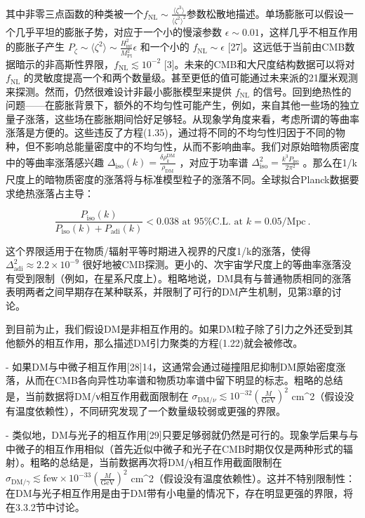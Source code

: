 其中非零三点函数的种类被一个\( f_{\text{NL}} \sim \frac{\langle\zeta^3\rangle}{\langle\zeta^2\rangle^2} \)参数松散地描述。单场膨胀可以假设一个几乎平坦的膨胀子势，对应于一个小的慢滚参数 \( \epsilon \sim 0.01 \)，这样几乎不相互作用的膨胀子产生 \( P_\zeta \sim \langle\zeta^2\rangle \sim \frac{H^2_{\text{inf}}}{M^2_{\text{Pl}}}\epsilon \) 和一个小的 \( f_{\text{NL}} \sim \epsilon \) [27]。这远低于当前由CMB数据暗示的非高斯性界限，\( f_{\text{NL}} \lesssim 10^{-2} \) [3]。未来的CMB和大尺度结构数据可以将对 \( f_{\text{NL}} \) 的灵敏度提高一个和两个数量级。甚至更低的值可能通过未来派的21厘米观测来探测。然而，仍然很难设计非最小膨胀模型来提供 \( f_{\text{NL}} \) 的信号。回到绝热性的问题——在膨胀背景下，额外的不均匀性可能产生，例如，来自其他一些场的独立量子涨落，这些场在膨胀期间恰好足够轻。从现象学角度来看，考虑所谓的等曲率涨落是方便的。这些违反了方程(1.35)，通过将不同的不均匀性归因于不同的物种，但不影响总能量密度中的不均匀性，从而不影响曲率。我们对原始暗物质密度中的等曲率涨落感兴趣 \( \Delta_{\text{iso}}(k) = \frac{\delta\rho_k^{\text{DM}}}{\rho_{\text{DM}}} \) ，对应于功率谱 \( \Delta^2_{\text{iso}} = \frac{k^3P_{\text{iso}}}{2\pi^2} \) 。那么在1/k尺度上的暗物质密度的涨落将与标准模型粒子的涨落不同。全球拟合Planck数据要求绝热涨落占主导：

\[ \frac{P_{\text{iso}}(k)}{P_{\text{iso}}(k) + P_{\text{adi}}(k)} < 0.038 \text{ at 95\% C.L. at } k = 0.05/\text{Mpc} ~. \]

这个界限适用于在物质/辐射平等时期进入视界的尺度1/k的涨落，使得 \( \Delta^2_{\text{adi}} \approx 2.2 \times 10^{-9} \) 很好地被CMB探测。更小的、次宇宙学尺度上的等曲率涨落没有受到限制（例如，在星系尺度上）。粗略地说，DM具有与普通物质相同的涨落表明两者之间早期存在某种联系，并限制了可行的DM产生机制，见第3章的讨论。

到目前为止，我们假设DM是非相互作用的。如果DM粒子除了引力之外还受到其他额外的相互作用，那么描述DM引力聚类的方程(1.22)就会被修改。

- 如果DM与中微子相互作用[28]14，这通常会通过碰撞阻尼抑制DM原始密度涨落，从而在CMB各向异性功率谱和物质功率谱中留下明显的标志。粗略的总结是，当前数据将DM/ν相互作用截面限制在 \( \sigma_{\text{DM}/\nu} \lesssim 10^{-32} (\frac{M}{\text{GeV}})^2 \) cm^2（假设没有温度依赖性），不同研究发现了一个数量级较弱或更强的界限。

- 类似地，DM与光子的相互作用[29]只要足够弱就仍然是可行的。现象学后果与与中微子的相互作用相似（首先近似中微子和光子在CMB时期仅仅是两种形式的辐射）。粗略的总结是，当前数据再次将DM/γ相互作用截面限制在 \( \sigma_{\text{DM}/\gamma} \lesssim \text{few} \times 10^{-33} (\frac{M}{\text{GeV}})^2 \) cm^2（假设没有温度依赖性）。这并不特别限制性：在DM与光子相互作用是由于DM带有小电量的情况下，存在明显更强的界限，将在3.3.2节中讨论。

